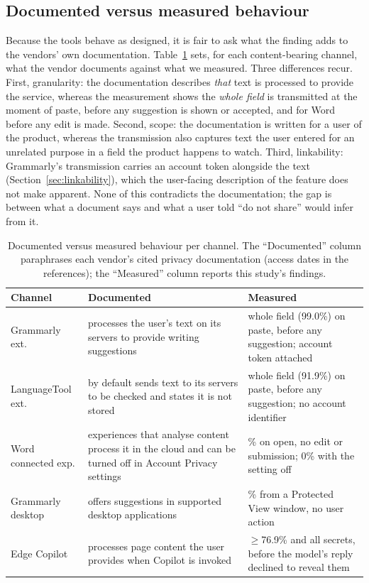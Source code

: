 \documentclass[sigconf,anonymous,review,balance=false]{acmart}
\begin{document}
\subsection{Documented versus measured behaviour}
\label{sec:disclosure}
Because the tools behave as designed, it is fair to ask what the finding adds to the
vendors' own documentation. Table~\ref{tab:disclosure} sets, for each content-bearing
channel, what the vendor documents against what we measured. Three differences recur.
First, granularity: the documentation describes \emph{that} text is processed to provide
the service, whereas the measurement shows the \emph{whole field} is transmitted at the
moment of paste, before any suggestion is shown or accepted, and for Word before any edit is
made. Second, scope: the documentation is written for a user of the product, whereas the
transmission also captures text the user entered for an unrelated purpose in a field the
product happens to watch. Third, linkability: Grammarly's transmission carries an account
token alongside the text (Section~\ref{sec:linkability}), which the user-facing description
of the feature does not make apparent. None of this contradicts the documentation; the gap
is between what a document says and what a user told ``do not share'' would infer from it.
\begin{table}
\caption{Documented versus measured behaviour per channel. The ``Documented'' column
paraphrases each vendor's cited privacy documentation (access dates in the references); the
``Measured'' column reports this study's findings.}
\label{tab:disclosure}
\small
\begin{tabular}{@{}>{\raggedright\arraybackslash}p{1.9cm}>{\raggedright\arraybackslash}p{2.7cm}>{\raggedright\arraybackslash}p{3.3cm}@{}}
\toprule
\textbf{Channel} & \textbf{Documented} & \textbf{Measured} \\
\midrule
Grammarly ext. & processes the user's text on its servers to provide writing suggestions~\cite{grammarly2025privacy} & whole field (99.0\%) on paste, before any suggestion; account token attached \\
LanguageTool ext. & by default sends text to its servers to be checked and states it is not stored~\cite{languagetool2025privacy} & whole field (91.9\%) on paste, before any suggestion; no account identifier \\
Word connected exp. & experiences that analyse content process it in the cloud and can be turned off in Account Privacy settings~\cite{microsoft2026connectedexp} & 96.8\% on open, no edit or submission; 0\% with the setting off \\
Grammarly desktop & offers suggestions in supported desktop applications~\cite{grammarly2025privacy} & 94.2\% from a Protected View window, no user action \\
Edge Copilot & processes page content the user provides when Copilot is invoked~\cite{microsoft2026copilotprivacy} & $\geq$76.9\% and all secrets, before the model's reply declined to reveal them \\
\bottomrule
\end{tabular}
\end{table}
\end{document}
